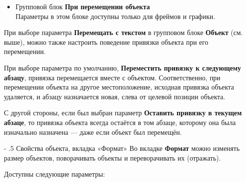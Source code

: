 ﻿\documentclass[a4paper,10pt]{article}
\makeatletter
\renewcommand\paragraph{%
   \@startsection{paragraph}{4}{0mm}%
      {-\baselineskip}%
      {.5\baselineskip}%
      {\normalfont\normalsize\bfseries}}
\makeatother
\begin{document}
\begin{itemize}
 \item Групповой блок \textbf{При перемещении объекта}\\
 Параметры в этом блоке доступны только для фреймов и графики.
\end{itemize}

При выборе параметра \textbf{Перемещать с текстом} в групповом блоке \textbf{Объект} (см. выше), можно также настроить поведение привязки объекта при его перемещении.

При выборе параметра по умолчанию, \textbf{Переместить привязку к следующему абзацу}, привязка перемещается вместе с объектом. Соответственно,  при перемещении объекта на другое местоположение, исходная привязка объекта удаляется, и абзацу назначается новая, слева от целевой позиции объекта.

С другой стороны, если был выбран параметр \textbf{Оставить привязку в текущем абзаце}, то привязка объекта всегда остаётся в том абзаце, которому она была изначально назначена — даже если объект был перемещён.

\paragraph{Свойства объекта, вкладка «Формат»} \label{sec:свойстваобъектавклформат}
Во вкладке \textbf{Формат} можно изменять размер объектов, поворачивать объекты и переворачивать их (отражать).

Доступны следующие параметры:
\end{document}
